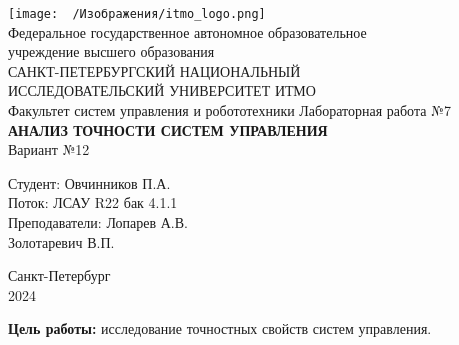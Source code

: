 \documentclass[a4paper]{article}
\begin{document}
\begin{titlepage}
    \begin{center}
    \texttt{[image: ~/Изображения/itmo\_logo.png]}\\[10pt]
        Федеральное государственное автономное образовательное \\ учреждение высшего образования \\[6pt]
        САНКТ-ПЕТЕРБУРГСКИЙ НАЦИОНАЛЬНЫЙ \\ ИССЛЕДОВАТЕЛЬСКИЙ УНИВЕРСИТЕТ ИТМО \\[16pt]
        Факультет систем управления и робототехники \vfill
        {\large Лабораторная работа №7} \\[0.5em]
        {\large \textbf{\MakeUppercase{Анализ точности систем управления}}}\\[0.5em]
        Вариант №12
    \end{center}\vfill
    \begin{flushright}
        Студент: Овчинников П.А.\\
        Поток: ЛСАУ R22 бак 4.1.1 \\[0.5em]
        Преподаватели: Лопарев А.В.\\Золотаревич В.П. 
    \end{flushright}\vfill
    \begin{center}
        {\small Санкт-Петербург \\ 2024}
    \end{center}
\end{titlepage}
\setcounter{page}{2}
\tableofcontents\newpage
\textbf{Цель работы:} исследование точностных свойств систем управления.
\end{document}

